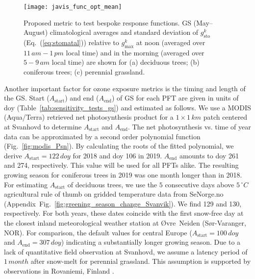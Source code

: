 \documentclass[bg, manuscript]{copernicus}
\begin{document}
\begin{figure}[t]
  \texttt{[image: javis\_func\_opt\_mean]}
  \caption{Proposed metric to test bespoke response functions. GS (May--August) climatological averages and standard deviation of $g_\mathrm{sto}^k$ (Eq.~(\ref{eq:stomatal})) relative to $g_\mathrm{max}^k$ at noon (averaged over $11\,\unit{am}-1\,\unit{pm}$ local time) and in the morning (averaged over $5-9\,\unit{am}$ local time) are shown for (a) deciduous trees; (b) coniferous trees; (c) perennial grassland. }
  \label{fig:javis_func_opt_mean}
\end{figure}

Another important factor for ozone exposure metrics is the timing and length of the GS. Start ($A_\text{start}$) and end ($A_\text{end}$) of GS for each PFT are given in units of \unit{doy} (Table~\ref{tab:sensitivity_tests_gs}) and estimated as follows. We use a MODIS (Aqua/Terra) retrieved net photosynthesis product for a $1\times 1\,\unit{km}$ patch centered at Svanhovd to determine $A_\text{start}$ and $A_\text{end}$. The net photosynthesis vs. time of year data can be approximated by a second order polynomial function (Fig.~\ref{fig:modis_Psn}). By calculating the roots of the fitted polynomial, we derive $A_\text{start} = 122\,\unit{doy}$ for 2018 and \unit{doy} 106 in 2019. $A_\text{end}$ amounts to \unit{doy} 261 and 274, respectively. This value will be used for all PFTs alike. The resulting growing season for coniferous trees in 2019 was one month longer than in 2018. For estimating $A_\text{start}$ of deciduous trees, we use the $5$ consecutive days above $5\,\unit{^\circ C}$ agricultural rule of thumb on gridded temperature data from SeNorge.no (Appendix~Fig.~\ref{fig:greening_season_change_Svanvik}). We find 129 and 130, respectively. For both years, these dates coincide with the first snow-free day at the closest inland meteorological weather station at Øvre~Neiden (Sør-Varanger, NOR).
For comparison, the default values for central Europe ($A_\mathrm{start} = 100\,\unit{doy}$ and $A_\mathrm{end} = 307\,\unit{doy}$) indicating a substantially longer growing season. Due to a lack of quantitative field observation at Svanhovd, we assume a latency period of $1\,\unit{month}$ after snow-melt for perennial grassland. This assumption is supported by observations in Rovaniemi, Finland \citep[][Supplement~Fig.~S1]{FCR:Korhonen2018}.
\end{document}
